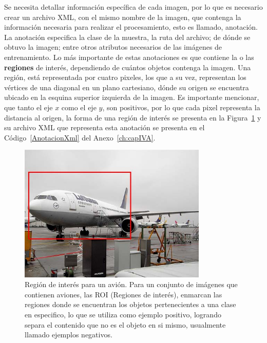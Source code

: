 Se necesita detallar información específica de cada imagen, por lo que es necesario crear un archivo XML, con el mismo nombre de la imagen, que contenga la información necesaria para realizar el procesamiento, esto es llamado, anotación. La anotación especifica la clase de la muestra, la ruta del archivo; de dónde se obtuvo la imagen; entre otros atributos necesarios de las imágenes de entrenamiento. Lo más importante de estas anotaciones es que contiene la o las \textbf{regiones} de interés, dependiendo de cuántos objetos contenga la imagen. Una región, está representada por cuatro pixeles, los que a su vez, representan los vértices de una diagonal en un plano cartesiano, dónde su origen se encuentra ubicado en la esquina superior izquierda de la imagen. Es importante mencionar, que tanto el eje $x$ como el eje $y$, son positivos, por lo que cada pixel representa la distancia al origen, la forma de una región de interés se presenta en la Figura~\ref{fig:anota} y su archivo XML que representa esta anotación se presenta en el Código~\ref{AnotacionXml} del Anexo~\ref{ch:capIVA}.

\begin{figure}[tb]
  \centering
   \includegraphics[width=0.8\textwidth]{Figuras/plain.jpg}
   \caption[Región de interés]{Región de interés para un avión. Para un conjunto de imágenes que contienen aviones, las ROI (Regiones de interés), enmarcan las regiones donde se encuentran los objetos pertenecientes a una clase en especifico, lo que se utiliza como ejemplo positivo, logrando separa el contenido que no es el objeto en si mismo, usualmente llamado ejemplos negativos.}
   \label{fig:anota}
\end{figure}

